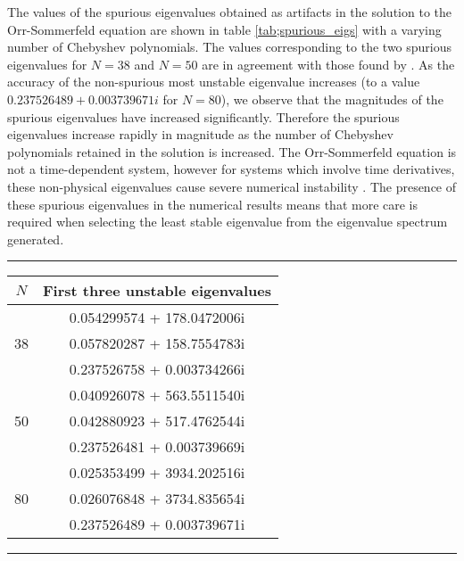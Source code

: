 \documentclass[a4paper, 12pt, twoside, openright]{article}
\numberwithin{equation}{section}
\begin{document}
The values of the spurious eigenvalues obtained as artifacts in the solution to the Orr-Sommerfeld equation are shown in table \ref{tab;spurious_eigs} with a varying number of Chebyshev polynomials. The values corresponding to the two spurious eigenvalues for $N=38$ and $N=50$ are in agreement with those found by \cite{Mcfadden90}. As the accuracy of the non-spurious most unstable eigenvalue increases (to a value $0.237526489 + 0.003739671i$ for $N=80$), we observe that the magnitudes of the spurious eigenvalues have increased significantly. Therefore the spurious eigenvalues increase rapidly in magnitude as the number of Chebyshev polynomials retained in the solution is increased. The Orr-Sommerfeld equation is not a time-dependent system, however for systems which involve time derivatives, these non-physical eigenvalues cause severe numerical instability \citep{Mcfadden90}. The presence of these spurious eigenvalues in the numerical results means that more care is required when selecting the least stable eigenvalue from the eigenvalue spectrum generated.  

\begin{table}[h]
\centering
\rule{\linewidth}{1.5pt}
\bgroup
\def\arraystretch{1.25}
\begin{tabular}{ c@{\qquad}| c }
$N$ & First three unstable eigenvalues \\\hline
\multirow{3}{*}{38}&0.054299574 + 178.0472006i\\&0.057820287 + 158.7554783i\\&0.237526758 + 0.003734266i\\
\hline
\multirow{3}{*}{50}&0.040926078 + 563.5511540i\\&0.042880923 + 517.4762544i\\&0.237526481 + 0.003739669i\\
\hline
\multirow{3}{*}{80}&0.025353499 + 3934.202516i\\&0.026076848 + 3734.835654i\\&0.237526489 + 0.003739671i\\
\end{tabular}
\egroup
{}
\rule{\linewidth}{1.5pt}
\end{table}
\end{document}
